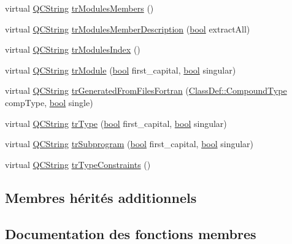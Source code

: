 \begin{DoxyCompactItemize}
\item 
virtual \hyperlink{class_q_c_string}{Q\+C\+String} \hyperlink{class_translator_serbian_a53684bca0a00b94d440e65406b64e8b2}{tr\+Modules\+Members} ()
\item 
virtual \hyperlink{class_q_c_string}{Q\+C\+String} \hyperlink{class_translator_serbian_a4df7aa8f3bbbec09c7e14c3496441af0}{tr\+Modules\+Member\+Description} (\hyperlink{qglobal_8h_a1062901a7428fdd9c7f180f5e01ea056}{bool} extract\+All)
\item 
virtual \hyperlink{class_q_c_string}{Q\+C\+String} \hyperlink{class_translator_serbian_a7198887f50b807e38f755814be867d1b}{tr\+Modules\+Index} ()
\item 
virtual \hyperlink{class_q_c_string}{Q\+C\+String} \hyperlink{class_translator_serbian_ab446d12d9db48e504978ee000ac67614}{tr\+Module} (\hyperlink{qglobal_8h_a1062901a7428fdd9c7f180f5e01ea056}{bool} first\+\_\+capital, \hyperlink{qglobal_8h_a1062901a7428fdd9c7f180f5e01ea056}{bool} singular)
\item 
virtual \hyperlink{class_q_c_string}{Q\+C\+String} \hyperlink{class_translator_serbian_af7f6212ef2996655d61f5a91e79cf0ab}{tr\+Generated\+From\+Files\+Fortran} (\hyperlink{class_class_def_ae70cf86d35fe954a94c566fbcfc87939}{Class\+Def\+::\+Compound\+Type} comp\+Type, \hyperlink{qglobal_8h_a1062901a7428fdd9c7f180f5e01ea056}{bool} single)
\item 
virtual \hyperlink{class_q_c_string}{Q\+C\+String} \hyperlink{class_translator_serbian_a4e2337dc59e7d631599c9983659c8bf5}{tr\+Type} (\hyperlink{qglobal_8h_a1062901a7428fdd9c7f180f5e01ea056}{bool} first\+\_\+capital, \hyperlink{qglobal_8h_a1062901a7428fdd9c7f180f5e01ea056}{bool} singular)
\item 
virtual \hyperlink{class_q_c_string}{Q\+C\+String} \hyperlink{class_translator_serbian_a99350a0857e003977fc4fc7d2a4e90ed}{tr\+Subprogram} (\hyperlink{qglobal_8h_a1062901a7428fdd9c7f180f5e01ea056}{bool} first\+\_\+capital, \hyperlink{qglobal_8h_a1062901a7428fdd9c7f180f5e01ea056}{bool} singular)
\item 
virtual \hyperlink{class_q_c_string}{Q\+C\+String} \hyperlink{class_translator_serbian_ae7b216be473a626ac47e09be80c4e6cf}{tr\+Type\+Constraints} ()
\end{DoxyCompactItemize}
\subsection*{Membres hérités additionnels}


\subsection{Documentation des fonctions membres}
\hypertarget{class_translator_serbian_a2580f17cd21e0f91bc9775dd0a163ae5}{}
